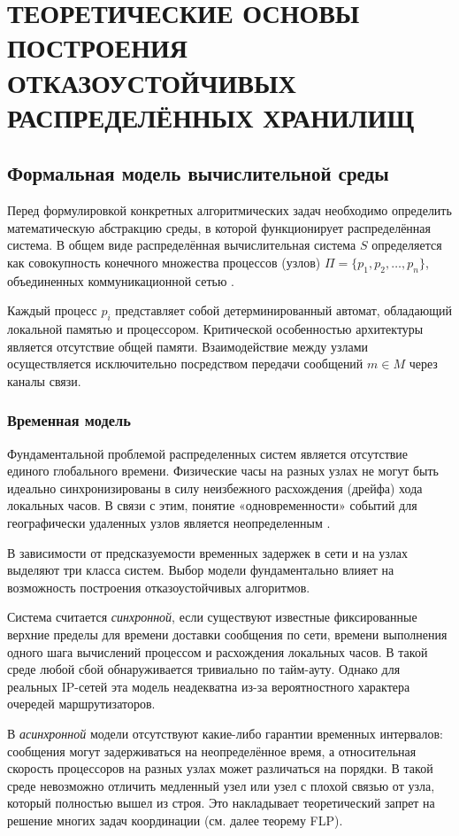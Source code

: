 \chapter{ТЕОРЕТИЧЕСКИЕ ОСНОВЫ ПОСТРОЕНИЯ ОТКАЗОУСТОЙЧИВЫХ РАСПРЕДЕЛЁННЫХ ХРАНИЛИЩ}

\section{Формальная модель вычислительной среды}

Перед формулировкой конкретных алгоритмических задач необходимо определить математическую абстракцию среды, в которой функционирует распределённая система. В общем виде распределённая вычислительная система $S$ определяется как совокупность конечного множества процессов (узлов) $\Pi = \{p_1, p_2, \dots, p_n\}$, объединенных коммуникационной сетью \cite{lynch_book,tanenbaum}.

Каждый процесс $p_i$ представляет собой детерминированный автомат, обладающий локальной памятью и процессором. Критической особенностью архитектуры является отсутствие общей памяти. Взаимодействие между узлами осуществляется исключительно посредством передачи сообщений $m \in M$ через каналы связи.

\subsection{Временная модель}

Фундаментальной проблемой распределенных систем является отсутствие единого глобального времени. Физические часы на разных узлах не могут быть идеально синхронизированы в силу неизбежного расхождения (дрейфа) хода локальных часов. В связи с этим, понятие «одновременности» событий для географически удаленных узлов является неопределенным \cite{tanenbaum}.

В зависимости от предсказуемости временных задержек в сети и на узлах выделяют три класса систем. Выбор модели фундаментально влияет на возможность построения отказоустойчивых алгоритмов.

Система считается \textit{синхронной}, если существуют известные фиксированные верхние пределы для времени доставки сообщения по сети, времени выполнения одного шага вычислений процессом и расхождения локальных часов. В такой среде любой сбой обнаруживается тривиально по тайм-ауту. Однако для реальных IP-сетей эта модель неадекватна из-за вероятностного характера очередей маршрутизаторов.

В \textit{асинхронной} модели отсутствуют какие-либо гарантии временных интервалов: сообщения могут задерживаться на неопределённое время, а относительная скорость процессоров на разных узлах может различаться на порядки. В такой среде невозможно отличить медленный узел или узел с плохой связью от узла, который полностью вышел из строя. Это накладывает теоретический запрет на решение многих задач координации (см. далее теорему FLP).

